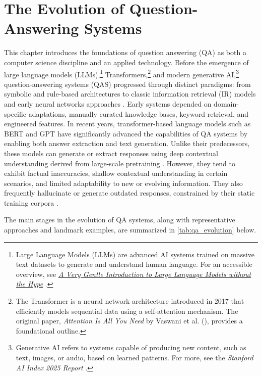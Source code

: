 \chapter{The Evolution of Question-Answering Systems}
\label{chap:QAS}
\sloppy
\begin{spacing}{1.5}

This chapter introduces the foundations of question answering (QA) as both a computer science discipline and an applied technology. Before the emergence of large language models (LLMs),\footnote{Large Language Models (LLMs) are advanced AI systems trained on massive text datasets to generate and understand human language. For an accessible overview, see \href{https://mark-riedl.medium.com/a-very-gentle-introduction-to-large-language-models-without-the-hype-5f67941fa59e}{\textit{A Very Gentle Introduction to Large Language Models without the Hype}} \citep{riedl_very_2023}.} Transformers,\footnote{The Transformer is a neural network architecture introduced in 2017 that efficiently models sequential data using a self-attention mechanism. The original paper, \textit{Attention Is All You Need} by Vaswani et al. (\citeyear{vaswani_attention_2017}), provides a foundational outline.} and modern generative AI,\footnote{Generative AI refers to systems capable of producing new content, such as text, images, or audio, based on learned patterns. For more, see the \textit{Stanford AI Index 2025 Report} \citep{maslej_artificial_2025}.} question-answering systems (QAS) progressed through distinct paradigms: from symbolic and rule-based architectures to classic information retrieval (IR) models and early neural networks approaches \citep{jurafsky_chapter_2024,antoniou_survey_2022}. Early systems depended on domain-specific adaptations, manually curated knowledge bases, keyword retrieval, and engineered features. In recent years, transformer-based language models such as BERT and GPT have significantly advanced the capabilities of QA systems by enabling both answer extraction and text generation. Unlike their predecessors, these models can generate or extract responses using deep contextual understanding derived from large-scale pretraining \citep{kaplan_scaling_2020}. However, they tend to exhibit factual inaccuracies, shallow contextual understanding in certain scenarios, and limited adaptability to new or evolving information. They also frequently hallucinate or generate outdated responses, constrained by their static training corpora \citep{harsh_comprehending_2024}.

The main stages in the evolution of QA systems, along with representative approaches and landmark examples, are summarized in \autoref{tab:qa_evolution} below.


\end{spacing}

